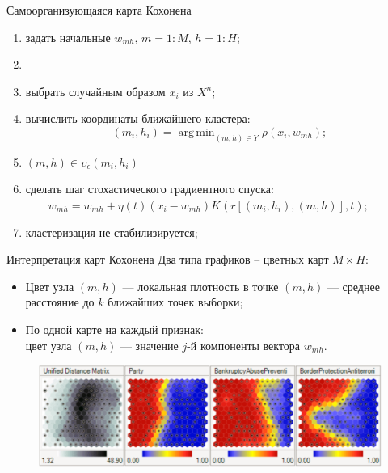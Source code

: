 \documentclass{beamer}
\DeclareMathOperator*{\argmin}{arg\,min}
\begin{document}
\begin{frame}{Самоорганизующаяся карта Кохонена}
	
	\begin{enumerate}
	\item задать начальные $w_{mh}$, $m=\overline{1:M}$, $h=\overline{1:H}$;
	\item {}
	\item\quad выбрать случайным образом $x_i$ из $X^n$;
	\item\quad вычислить координаты ближайшего кластера:
	$$(m_i,h_i)=\argmin_{(m,h)\in Y}\rho(x_i,w_{mh});$$
	\item{} $(m,h)\in\upsilon_{\epsilon}(m_i,h_i)$
	\item\qquad сделать шаг стохастического градиентного спуска:\\
	$\qquad w_{mh}=w_{mh}+\eta(t)(x_i-w_{mh})K\left(r[ (m_i,h_i),(m,h) ], t\right);$
	\item {} кластеризация не стабилизируется;
	\end{enumerate}
\end{frame}

\begin{frame}{Интерпретация карт Кохонена}
	Два типа графиков -- цветных карт $M\times H$:
	\begin{itemize}
		\item Цвет узла $(m,h)$ --- локальная плотность в точке $(m,h)$ --- среднее расстояние до $k$ ближайших точек выборки;
		\item По одной карте на каждый признак:\\
		цвет узла $(m,h)$ --- значение $j$-й компоненты вектора $w_{mh}.$
	\end{itemize}
	\vspace{.25cm}
	\begin{figure}
		\includegraphics[width=1\linewidth]{koh.pdf}
	\end{figure}
\end{frame}
\end{document}
